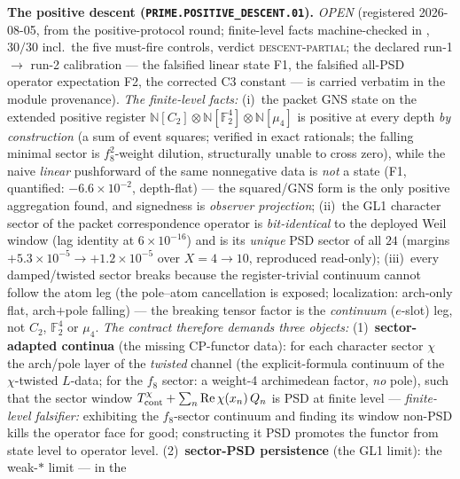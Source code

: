 \par\smallskip\noindent\textbf{The positive descent
(\texttt{PRIME.POSITIVE\_DESCENT.01}).}
{\sloppy
\emph{OPEN} (registered 2026-08-05, from the positive-protocol
round; finite-level facts machine-checked in
, $30/30$ incl.\ the five
must-fire controls, verdict \textsc{descent-partial}; the declared
run-1 $\to$ run-2 calibration --- the falsified linear state F1,
the falsified all-PSD operator expectation F2, the corrected C3
constant --- is carried verbatim in the module provenance).
\emph{The finite-level facts:} (i)~the packet GNS state on the
extended positive register
$\mathbb N[C_2]\otimes\mathbb N[\mathbb F_2^4]\otimes
\mathbb N[\mu_4]$ is positive at every depth \emph{by
construction} (a sum of event squares; verified in exact
rationals; the falling minimal sector is $f_8^2$-weight dilution,
structurally unable to cross zero), while the naive \emph{linear}
pushforward of the same nonnegative data is \emph{not} a state
(F1, quantified: $-6.6\times10^{-2}$, depth-flat) --- the
squared/GNS form is the only positive aggregation found, and
signedness is \emph{observer projection}; (ii)~the GL1 character
sector of the packet correspondence operator is
\emph{bit-identical} to the deployed Weil window (lag identity at
$6\times10^{-16}$) and is its \emph{unique} PSD sector of all $24$
(margins $+5.3\times10^{-5}\to+1.2\times10^{-5}$ over $X=4\to10$,
reproduced read-only); (iii)~every damped/twisted sector breaks
because the register-trivial continuum cannot follow the atom leg
(the pole--atom cancellation is exposed; localization: arch-only
flat, arch$+$pole falling) --- the breaking tensor factor is the
\emph{continuum} ($e$-slot) leg, not $C_2$, $\mathbb F_2^4$ or
$\mu_4$.  \emph{The contract therefore demands three objects:}
(1)~\textbf{sector-adapted continua} (the missing CP-functor
data): for each character sector $\chi$ the arch/pole layer of the
\emph{twisted} channel (the explicit-formula continuum of the
$\chi$-twisted $L$-data; for the $f_8$ sector: a weight-4
archimedean factor, \emph{no} pole), such that the sector window
$T_{\rm cont}^{\chi}+\sum_n\operatorname{Re}\chi(x_n)\,Q_n$ is PSD
at finite level --- \emph{finite-level falsifier:} exhibiting the
$f_8$-sector continuum and finding its window non-PSD kills the
operator face for good; constructing it PSD promotes the functor
from state level to operator level.  (2)~\textbf{sector-PSD
persistence} (the GL1 limit): the weak-$*$ limit --- in the
}
